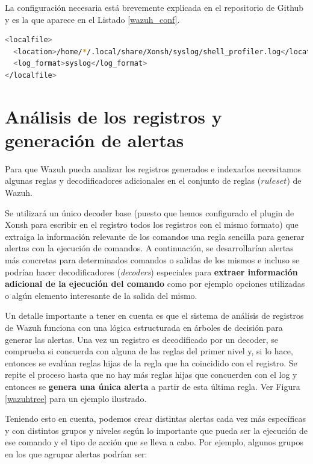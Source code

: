 La configuración necesaria está brevemente explicada en el repositorio de Github y es la que aparece en el Listado \ref{wazuh_conf}.

\begin{lstlisting}[language=bash,caption={Configuración necesaria para que Wazuh analice los logs generados por Xonsh}, label=wazuh_conf]
<localfile>
  <location>/home/*/.local/share/Xonsh/syslog/shell_profiler.log</location>
  <log_format>syslog</log_format>
</localfile>
\end{lstlisting}



\section{Análisis de los registros y generación de alertas}

Para que Wazuh pueda analizar los registros generados e indexarlos necesitamos algunas reglas y decodificadores adicionales en el conjunto de reglas ($ruleset$) de Wazuh.

Se utilizará un único decoder base (puesto que hemos configurado el plugin de Xonsh para escribir en el registro todos los registros con el mismo formato) que extraiga la información relevante de los comandos  una regla sencilla para generar alertas con la ejecución de comandos. A continuación, se desarrollarían alertas más concretas para determinados comandos o salidas de los mismos e incluso se podrían hacer decodificadores ({\it decoders}) especiales para \textbf{extraer información adicional de la ejecución del comando} como por ejemplo opciones utilizadas o algún elemento interesante de la salida del mismo.

Un detalle importante a tener en cuenta es que el sistema de análisis de registros de Wazuh funciona con una lógica estructurada en árboles de decisión para generar las alertas. Una vez un registro es decodificado por un decoder, se comprueba si concuerda con alguna de las reglas del primer nivel y, si lo hace, entonces se evalúan reglas hijas de la regla que ha coincidido con el registro. Se repite el proceso hasta que no hay más reglas hijas que concuerden con el log y entonces se \textbf{genera una única alerta} a partir de esta última regla. Ver Figura \ref{wazuhtree} para un ejemplo ilustrado.

Teniendo esto en cuenta, podemos crear distintas alertas cada vez más específicas y con distintos grupos y niveles según lo importante que pueda ser la ejecución de ese comando y el tipo de acción que se lleva a cabo. Por ejemplo, algunos grupos en los que agrupar alertas podrían ser:

